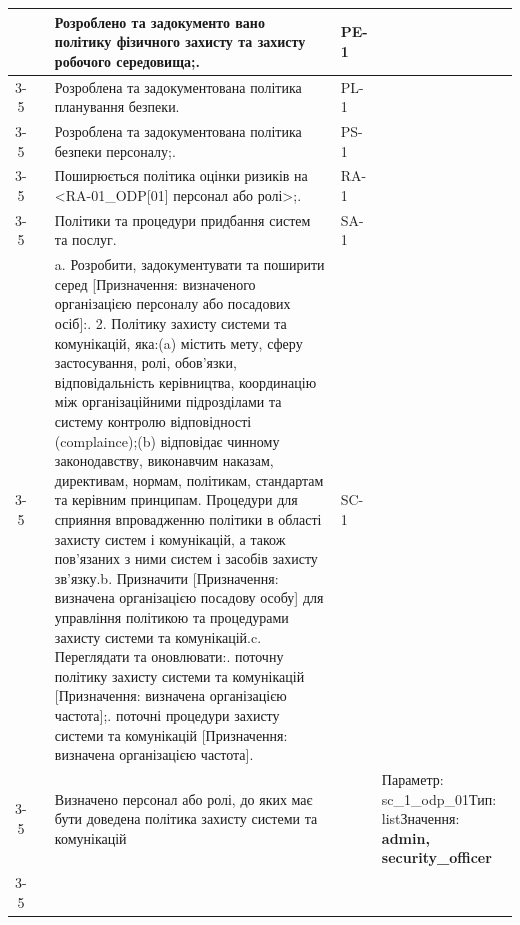 \documentclass[10pt]{article}
\begin{document}
\begin{longtable}{|c|>{\raggedright\arraybackslash}p{4cm}|>{\raggedright\arraybackslash}p{6cm}|>{\raggedright\arraybackslash}p{1.5cm}|>{\raggedright\arraybackslash}p{3.5cm}|}
 &  & Розроблено та задокументо вано політику фізичного захисту та захисту робочого середовища;.\newline  & PE-1 & \\ \cline{3-5}
 &  & Розроблена та задокументована політика планування безпеки.\newline  & PL-1 & \\ \cline{3-5}
 &  & Розроблена та задокументована політика безпеки персоналу;.\newline  & PS-1 & \\ \cline{3-5}
 &  & Поширюється політика оцінки ризиків на <RA-01\_\allowbreak{}ODP[01] персонал або ролі>;.\newline  & RA-1 & \\ \cline{3-5}
 &  & Політики та процедури придбання систем та послуг.\newline  & SA-1 & \\ \cline{3-5}
 &  & a. Розробити, задокументувати та поширити серед [Призначення: визначеного організацією персоналу або посадових осіб]:\newline 1. 2. Політику захисту системи та комунікацій, яка:\newline (a) містить мету, сферу застосування, ролі, обов'язки, відповідальність керівництва, координацію між організаційними підрозділами та систему контролю відповідності (complaince);\newline (b) відповідає чинному законодавству, виконавчим наказам, директивам, нормам, політикам, стандартам та керівним принципам. Процедури для сприяння впровадженню політики в області захисту систем і комунікацій, а також пов'язаних з ними систем і засобів захисту зв'язку.\newline b. Призначити [Призначення: визначена організацією посадову особу] для управління політикою та процедурами захисту системи та комунікацій.\newline c. Переглядати та оновлювати:\newline 1. поточну політику захисту системи та комунікацій [Призначення: визначена організацією частота];\newline 2. поточні процедури захисту системи та комунікацій [Призначення: визначена організацією частота]. & SC-1 & \\ \cline{3-5}
 &  & Визначено персонал або ролі, до яких має бути доведена політика захисту системи та комунікацій &  & Параметр: sc\_\allowbreak{}1\_\allowbreak{}odp\_\allowbreak{}01\newline Тип: list\newline Значення: \textbf{admin, security\_\allowbreak{}officer} \\ \cline{3-5}

\end{longtable}
\end{document}
